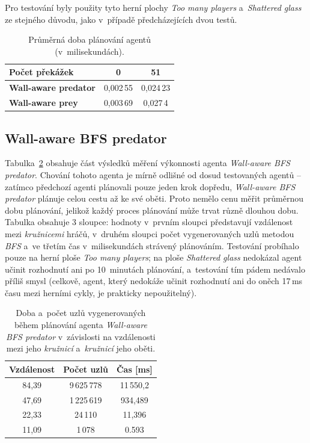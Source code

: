 Pro testování byly použity tyto herní plochy \emph{Too many players} a~\emph{Shattered glass} ze stejného důvodu, jako v~případě předcházejících dvou testů.

\begin{table}[ht]
    \centering
    \begin{tabular}{|l|c|c|} \hline
        \textbf{Počet překážek}      & \textbf{0}  & \textbf{51} \\ \hline\hline
        \textbf{Wall-aware predator} & 0,002\,55   & 0,024\,23   \\ \hline
        \textbf{Wall-aware prey}     & 0,003\,69   & 0,027\,4    \\ \hline
    \end{tabular}
    \caption{Průměrná doba plánování  agentů (v~milisekundách).}
    \label{tab:benchmark-wall-aware-bots}
\end{table}

\subsection*{Wall-aware BFS predator}

Tabulka~\ref{tab:benchmark-wall-aware-bfs-predator} obsahuje část výsledků měření výkonnosti agenta \emph{Wall-aware BFS predator}. Chování tohoto agenta je mírně odlišné od dosud testovaných agentů -- zatímco předchozí agenti plánovali pouze jeden krok dopředu, \emph{Wall-aware BFS predator} plánuje celou cestu až ke své oběti. Proto nemělo cenu měřit průměrnou dobu plánování, jelikož každý proces plánování může trvat různě dlouhou dobu. Tabulka obsahuje 3 sloupce: hodnoty v~prvním sloupci představují vzdálenost mezi \emph{kružnicemi} hráčů, v~druhém sloupci počet vygenerovaných uzlů metodou \emph{BFS} a~ve třetím čas v~milisekundách strávený plánováním. Testování probíhalo pouze na herní ploše \emph{Too many players}; na ploše \emph{Shattered glass} nedokázal agent učinit rozhodnutí ani po 10~minutách plánování, a~testování tím pádem nedávalo příliš smysl (celkově, agent, který nedokáže učinit rozhodnutí ani do oněch 17\,ms času mezi herními cykly, je prakticky nepoužitelný).

\begin{table}[ht]
    \centering
    \begin{tabular}{|c|c|c|} \hline
        \textbf{Vzdálenost} & \textbf{Počet uzlů} & \textbf{Čas [ms]} \\ \hline
        84,39               & 9\,625\,778         & 11\,550,2    \\ \hline
        47,69               & 1\,225\,619         & 934,489      \\ \hline
        22,33               & 24\,110             & 11,396       \\ \hline
        11,09               & 1\,078              & 0.593        \\ \hline
    \end{tabular}
    \caption{Doba a~počet uzlů vygenerovaných během plánování agenta \emph{Wall-aware BFS predator} v~závislosti na vzdálenosti mezi jeho \emph{kružnicí} a~\emph{kružnicí} jeho oběti.}
    \label{tab:benchmark-wall-aware-bfs-predator}
\end{table}

